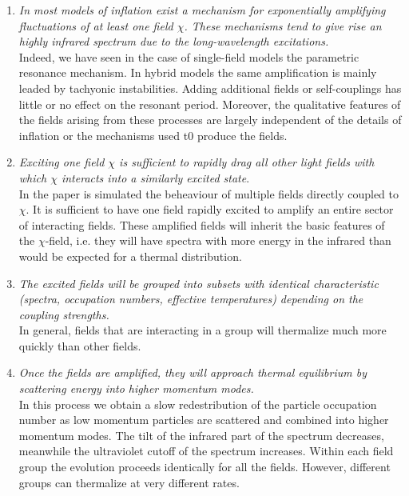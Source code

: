 \documentclass[11pt,a4paper,twoside]{book}
\begin{document}
\begin{enumerate}
	\item \textit{In most models of inflation exist a mechanism for exponentially amplifying fluctuations of at least one field $\chi$. These mechanisms tend to give rise an highly infrared spectrum due to the long-wavelength excitations.}\\
	Indeed, we have seen in the case of single-field models the parametric resonance mechanism. In hybrid models the same amplification is mainly leaded by tachyonic instabilities. Adding additional fields or self-couplings has little or no effect on the resonant period. Moreover, the qualitative features of the fields arising from these processes are largely independent of the details of inflation or the mechanisms used t0 produce the fields.
	
	\item \textit{Exciting one field $\chi$ is sufficient to rapidly drag all other light fields with which $\chi$ interacts into a similarly excited state}. \\
	In the paper is simulated the beheaviour of multiple fields directly coupled to $\chi$. It is sufficient to have one field rapidly excited to amplify an entire sector of interacting fields. These  amplified fields will inherit the basic features of the $\chi$-field, i.e. they will have spectra with more energy in the infrared than would be expected for a thermal distribution.
	
	\item \textit{The excited fields will be grouped into subsets with identical characteristic (spectra, occupation numbers, effective temperatures) depending on the coupling strengths.}\\
	In general, fields  that are interacting in a group will thermalize much more quickly than other fields. 
	
	\item \textit{Once the fields are amplified, they will approach thermal equilibrium by scattering energy into higher momentum modes.}\\
	In this process we obtain a slow redestribution of the particle occupation number as low momentum particles are scattered and combined into higher momentum modes. The tilt of the infrared part of the spectrum decreases, meanwhile the ultraviolet cutoff of the spectrum increases. Within each field group the evolution proceeds identically for all the fields. However, different groups can thermalize at very different rates.
\end{enumerate}
\end{document}

